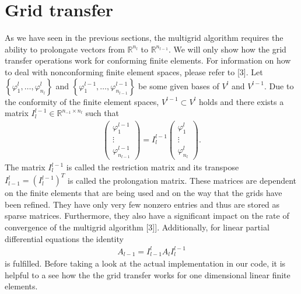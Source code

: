 \documentclass[letterpaper,10pt,english, openany]{sphinxmanual}
\begin{document}
\section{Grid transfer}
\label{\detokenize{basics:grid-transfer}}
As we have seen in the previous sections, the multigrid algorithm requires the ability to
prolongate vectors from \(\mathbb{R}^{n_{l}}\) to \(\mathbb{R}^{n_{l-1}}\).
We will only show how the grid transfer operations work for conforming finite elements.
For information on how to deal with non\sphinxhyphen{}conforming finite element spaces, please refer to {[}3{]}.
Let \(\left\{\varphi_1^l, \dots, \varphi_{n_{l}}^l\right\}\) and
\(\left\{\varphi_1^{l-1}, \dots, \varphi_{n_{l-1}}^{l-1}\right\}\) be some given bases of
\(V^l\) and \(V^{l-1}\).
Due to the conformity of the finite element spaces,
\(V^{l-1} \subset V^l\) holds and there exists a matrix \(I^{l-1}_l \in \mathbb{R}^{n_{-1} \times n_l}\)
such that
\begin{equation*}
\begin{split}\begin{pmatrix}
\varphi_1^{l-1} \\
\vdots \\
\varphi_{n_{l-1}}^{l-1}
\end{pmatrix} = I^{l-1}_l
\begin{pmatrix}
\varphi_1^{l} \\
\vdots \\
\varphi_{n_{l}}^{l}
\end{pmatrix}.\end{split}
\end{equation*}
The matrix \(I^{l-1}_l\) is called the {\color{blue}restriction matrix} and its transpose \(I^{l}_{l-1} = \left(I^{l-1}_l\right)^T\) is called the {\color{blue}prolongation matrix.}
These matrices are dependent on the finite elements that are being used and on the way that the grids have been refined.
They have only very few non\sphinxhyphen{}zero entries and thus are stored as sparse matrices.
Furthermore, they also have a significant impact on the rate of convergence of the multigrid algorithm {[}3{]}{]}.
Additionally, for linear partial differential equations the identity
\begin{equation*}
\begin{split}A_{l-1} = I^{l}_{l-1} A_l I^{l-1}_l\end{split}
\end{equation*}
is fulfilled. Before taking a look at the actual implementation in our code,
it is helpful to a see how the the grid transfer works for one dimensional linear finite elements.
\end{document}
